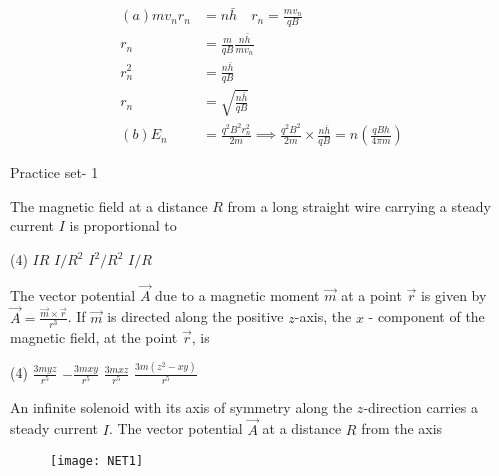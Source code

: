 \begin{answer}
\begin{align*}
(a)mv_nr_n&=n\bar{h} \quad r_n=\frac{mv_n}{qB}\\
r_n&=\frac{m}{qB}\frac{n\bar{h}}{mv_n}\\
r_n^2&=\frac{n\bar{h}}{qB}\\
r_n&=\sqrt{\frac{n\bar{h}}{qB}}\\
(b) E_n&=\frac{q^2B^2r^2_n}{2m}\implies \frac{q^2B^2}{2m}\times\frac{n\bar{h}}{qB}=n\left( \frac{qBh}{4\pi m}\right)  
\end{align*}
\end{answer}
\newpage
\begin{abox}
	Practice set- 1
	\end{abox}
\begin{enumerate}
\begin{minipage}{\textwidth}
	\item The magnetic field at a distance $R$ from a long straight wire carrying a steady current $I$ is proportional to
\end{minipage}
\begin{tasks}(4)
	\task[\textbf{A.}] $I R$
	\task[\textbf{B.}] $I / R^{2}$
	\task[\textbf{C.}]$I^{2} / R^{2}$
	\task[\textbf{D.}]$I / R$
\end{tasks}
\begin{minipage}{\textwidth}
	\item The vector potential $\vec{A}$ due to a magnetic moment $\vec{m}$ at a point $\vec{r}$ is given by $\vec{A}=\frac{\vec{m} \times \vec{r}}{r^{3}}$.
	If $\vec{m}$ is directed along the positive $z$-axis, the $x$ - component of the magnetic field, at the point $\vec{r}$, is
\end{minipage}
\begin{tasks}(4)
	\task[\textbf{A.}] $\frac{3 m y z}{r^{5}}$
	\task[\textbf{B.}] $-\frac{3 m x y}{r^{5}}$
	\task[\textbf{C.}]$\frac{3 m x z}{r^{5}}$
	\task[\textbf{D.}]$\frac{3 m\left(z^{2}-x y\right)}{r^{5}}$
\end{tasks}
\begin{minipage}{\textwidth}
	\item An infinite solenoid with its axis of symmetry along the $z$-direction carries a steady current $I$.
	The vector potential $\vec{A}$ at a distance $R$ from the axis
	\begin{figure}[H]
		\centering
		\texttt{[image: NET1]}
	\end{figure}

\end{minipage}
\end{enumerate}
